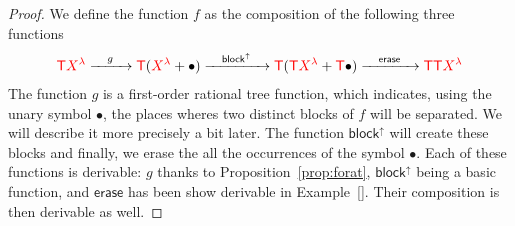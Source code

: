 \begin{proof}
We define the function $f$ as the composition of the following three functions
\begin{align*}
{\color{red}{\mathsf T}} {\color{red}{X^\lambda}} \xrightarrow{\quad g\quad} {\color{red}{\mathsf T}} ({\color{red}{X^\lambda}}+\bullet) \xrightarrow{\quad \mathsf{block}^\uparrow\quad} {\color{red}{\mathsf T}} ({\color{red}{\mathsf T}}{\color{red}{X^\lambda}}+{\color{red}{\mathsf T}}\bullet)
\xrightarrow{\quad \mathsf{erase}\quad} {\color{red}{\mathsf T}} {\color{red}{\mathsf T}}{\color{red}{X^\lambda}}
\end{align*}
The function $g$ is a first-order rational tree function, which indicates, using the unary symbol $\bullet$, the places wheres two distinct blocks of $f$ will be separated. We will describe it more precisely a bit later. The function $\mathsf{block}^\uparrow$ will create these blocks and finally, we erase the all the occurrences of the symbol $\bullet$.
Each of these functions is derivable: $g$ thanks to Proposition~\ref{prop:forat}, $\mathsf{block}^\uparrow$ being a basic function, and $\mathsf{erase}$ has been show derivable in Example~\ref{}. Their composition is then derivable as well.
 

\end{proof}
